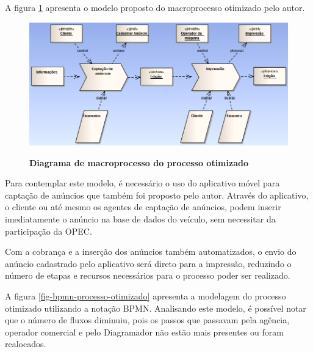 \documentclass[
	12pt,				%
	openright,			%
	oneside,			%
	a4paper,			%
	chapter=TITLE,		%
	section=TITLE,		%
	english,			%
	french,				%
	spanish,			%
	brazil				%
	]{abntex2}
\begin{document}
A figura \ref{fig-diag-macroprocesso-otimizado} apresenta o modelo proposto do macroprocesso otimizado pelo autor.
\begin{figure}[h]
	\begin{center}
		\caption{
			\textbf{Diagrama de macroprocesso do processo otimizado}
		}\label{fig-diag-macroprocesso-otimizado}
		\includegraphics [scale=0.65]{imagens/diagrama_macro_processo_otimizado.png}
		\label{fig-diag-macroprocesso-otimizado}
	\end{center}
\end{figure}

Para contemplar este modelo, é necessário o uso do aplicativo móvel para captação de anúncios que também foi proposto pelo autor. Através do aplicativo, o cliente ou até mesmo os agentes de captação de anúncios, podem inserir imediatamente o anúncio na base de dados do veículo, sem necessitar da participação da OPEC.

Com a cobrança e a inserção dos anúncios também automatizados, o envio do anúncio cadastrado pelo aplicativo será direto para a impressão, reduzindo o número de etapas e recursos necessários para o processo poder ser realizado.

A figura \ref{fig-bpmn-processo-otimizado} apresenta a modelagem do processo otimizado utilizando a notação BPMN. Analisando este modelo, é possível notar que o número de fluxos diminuiu, pois os passos que passavam pela agência, operador comercial e pelo Diagramador não estão mais presentes ou foram realocados. \\ \\ \\ \\ 
\end{document}

